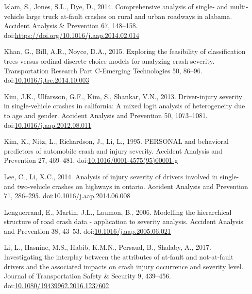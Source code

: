 \documentclass[]{elsarticle} %
\begin{document}
\leavevmode\hypertarget{ref-Islam2014comprehensive}{}%
Islam, S., Jones, S.L., Dye, D., 2014. Comprehensive analysis of single-
and multi-vehicle large truck at-fault crashes on rural and urban
roadways in alabama. Accident Analysis \& Prevention 67, 148--158.
doi:\href{https://doi.org/https://doi.org/10.1016/j.aap.2014.02.014}{https://doi.org/10.1016/j.aap.2014.02.014}

\leavevmode\hypertarget{ref-Khan2015exploring}{}%
Khan, G., Bill, A.R., Noyce, D.A., 2015. Exploring the feasibility of
classification trees versus ordinal discrete choice models for analyzing
crash severity. Transportation Research Part C-Emerging Technologies 50,
86--96.
doi:\href{https://doi.org/10.1016/j.trc.2014.10.003}{10.1016/j.trc.2014.10.003}

\leavevmode\hypertarget{ref-Kim2013driver}{}%
Kim, J.K., Ulfarsson, G.F., Kim, S., Shankar, V.N., 2013. Driver-injury
severity in single-vehicle crashes in california: A mixed logit analysis
of heterogeneity due to age and gender. Accident Analysis and Prevention
50, 1073--1081.
doi:\href{https://doi.org/10.1016/j.aap.2012.08.011}{10.1016/j.aap.2012.08.011}

\leavevmode\hypertarget{ref-Kim1995personal}{}%
Kim, K., Nitz, L., Richardson, J., Li, L., 1995. PERSONAL and behavioral
predictors of automobile crash and injury severity. Accident Analysis
and Prevention 27, 469--481.
doi:\href{https://doi.org/10.1016/0001-4575(95)00001-g}{10.1016/0001-4575(95)00001-g}

\leavevmode\hypertarget{ref-Lee2014analysis}{}%
Lee, C., Li, X.C., 2014. Analysis of injury severity of drivers involved
in single- and two-vehicle crashes on highways in ontario. Accident
Analysis and Prevention 71, 286--295.
doi:\href{https://doi.org/10.1016/j.aap.2014.06.008}{10.1016/j.aap.2014.06.008}

\leavevmode\hypertarget{ref-Lenguerrand2006modelling}{}%
Lenguerrand, E., Martin, J.L., Laumon, B., 2006. Modelling the
hierarchical structure of road crash data - application to severity
analysis. Accident Analysis and Prevention 38, 43--53.
doi:\href{https://doi.org/10.1016/j.aap.2005.06.021}{10.1016/j.aap.2005.06.021}

\leavevmode\hypertarget{ref-Li2017interplay}{}%
Li, L., Hasnine, M.S., Habib, K.M.N., Persaud, B., Shalaby, A., 2017.
Investigating the interplay between the attributes of at-fault and
not-at-fault drivers and the associated impacts on crash injury
occurrence and severity level. Journal of Transportation Safety \&
Security 9, 439--456.
doi:\href{https://doi.org/10.1080/19439962.2016.1237602}{10.1080/19439962.2016.1237602}
\end{document}
